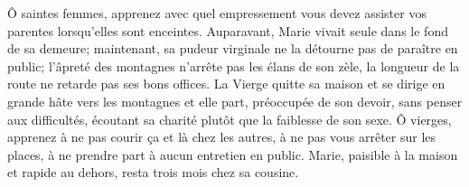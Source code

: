 Ô saintes femmes,
	apprenez avec quel empressement vous devez assister vos parentes
		lorsqu’elles sont enceintes.
Auparavant, Marie vivait seule dans le fond de sa demeure;
	maintenant, sa pudeur virginale ne la détourne pas de paraître en public;
	l’âpreté des montagnes n’arrête pas les élans de son zèle,
	la longueur de la route ne retarde pas ses bons offices.
La Vierge quitte sa maison
	et se dirige en grande hâte vers les montagnes
	et elle part, préoccupée de son devoir, sans penser aux difficultés,
	écoutant sa charité plutôt que la faiblesse de son sexe.
Ô vierges, apprenez à ne pas courir ça et là chez les autres,
	à ne pas vous arrêter sur les places,
	à ne prendre part à aucun entretien en public.
Marie, paisible à la maison et rapide au dehors,
	resta trois mois chez sa cousine.
